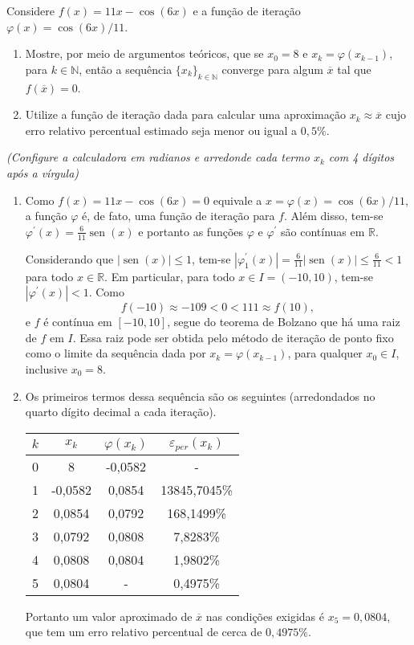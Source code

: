 \documentclass[12pt,a4paper]{article}
\newcommand*\sen{\operatorname{sen}}
\newcommand*\R{\mathbb{R}}
\begin{document}
\begin{ExerciseList}
\Exercise[title={2,5}]
Considere $f(x) = 11x-\cos(6x)$ e a função de iteração $\varphi(x) = \cos(6x)/11$.
\begin{enumerate}
\item Mostre, por meio de argumentos teóricos, que se $x_0 = 8$ e $x_k = \varphi(x_{k-1})$, para $k \in \mathbb{N}$, então a sequência $\{x_k\}_{k \in \mathbb{N}}$ converge para algum $\overline{x}$ tal que $f(\overline{x}) = 0$.
\item Utilize a função de iteração dada para calcular uma aproximação $x_k \approx \overline{x}$ cujo erro relativo percentual estimado seja menor ou igual a $0,5\%$.
\end{enumerate}
\textit{(Configure a calculadora em radianos e arredonde cada termo $x_k$ com 4 dígitos após a vírgula)}
\Answer
\begin{enumerate}
\item Como $f(x) = 11x - \cos(6x) = 0$ equivale a $x = \varphi(x) = \cos(6x)/11$, a função $\varphi$ é, de fato, uma função de iteração para $f$. Além disso, tem-se $\varphi^\prime(x) = \frac{6}{11}\sen(x)$ e portanto as funções $\varphi$ e $\varphi^\prime$ são contínuas em $\R$.

Considerando que $|\sen(x)| \leq 1$, tem-se $|\varphi_1^\prime(x)| = \frac{6}{11}|\sen(x)|\leq \frac{6}{11} < 1$ para todo $x \in \R$. Em particular, para todo $x \in I = (-10, 10)$, tem-se $|\varphi^\prime(x)| < 1$. Como
\[
f(-10) \approx -109 < 0 < 111 \approx f(10),
\]
e $f$ é contínua em $[-10, 10]$, segue do teorema de Bolzano que há uma raiz de $f$ em $I$. Essa raiz pode ser obtida pelo método de iteração de ponto fixo como o limite da sequência dada por $x_k = \varphi(x_{k-1})$, para qualquer $x_0 \in I$, inclusive $x_0 = 8$.

\item Os primeiros termos dessa sequência são os seguintes (arredondados no quarto dígito decimal a cada iteração).
\begin{center}
\begin{tabular}{cccc}
\hline
$k$ & $x_k$ & $\varphi(x_k)$ & $\varepsilon_{per}(x_k)$\\
\hline
0 & 8 & -0,0582 & -\\
1 & -0,0582 & 0,0854 & 13845,7045\%\\
2 & 0,0854 & 0,0792 & 168,1499\%\\
3 & 0,0792 & 0,0808 & 7,8283\%\\
4 & 0,0808 & 0,0804 & 1,9802\%\\
5 & 0,0804 & - & 0,4975\%\\
\hline
\end{tabular}
\end{center}
Portanto um valor aproximado de $\overline{x}$ nas condições exigidas é $x_5 = 0,0804$, que tem um erro relativo percentual de cerca de $0,4975\%$.
\end{enumerate}


\end{ExerciseList}
\end{document}
